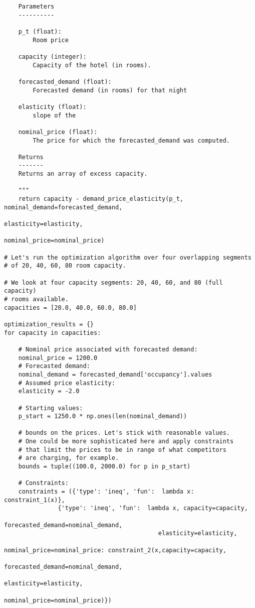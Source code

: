 \begin{verbatim}
    Parameters
    ----------

    p_t (float):
        Room price

    capacity (integer):
        Capacity of the hotel (in rooms).

    forecasted_demand (float):
        Forecasted demand (in rooms) for that night

    elasticity (float):
        slope of the

    nominal_price (float):
        The price for which the forecasted_demand was computed.

    Returns
    -------
    Returns an array of excess capacity.

    """
    return capacity - demand_price_elasticity(p_t, nominal_demand=forecasted_demand,
                                                        elasticity=elasticity,
                                                        nominal_price=nominal_price)

# Let's run the optimization algorithm over four overlapping segments
# of 20, 40, 60, 80 room capacity.

# We look at four capacity segments: 20, 40, 60, and 80 (full capacity)
# rooms available.
capacities = [20.0, 40.0, 60.0, 80.0]

optimization_results = {}
for capacity in capacities:

    # Nominal price associated with forecasted demand:
    nominal_price = 1200.0
    # Forecasted demand:
    nominal_demand = forecasted_demand['occupancy'].values
    # Assumed price elasticity:
    elasticity = -2.0

    # Starting values:
    p_start = 1250.0 * np.ones(len(nominal_demand))

    # bounds on the prices. Let's stick with reasonable values.
    # One could be more sophisticated here and apply constraints
    # that limit the prices to be in range of what competitors
    # are charging, for example.
    bounds = tuple((100.0, 2000.0) for p in p_start)

    # Constraints:
    constraints = ({'type': 'ineq', 'fun':  lambda x:  constraint_1(x)},
               {'type': 'ineq', 'fun':  lambda x, capacity=capacity,
                                           forecasted_demand=nominal_demand,
                                           elasticity=elasticity,
                                           nominal_price=nominal_price: constraint_2(x,capacity=capacity,
                                                                                     forecasted_demand=nominal_demand,
                                                                                     elasticity=elasticity,
                                                                                     nominal_price=nominal_price)})


\end{verbatim}
